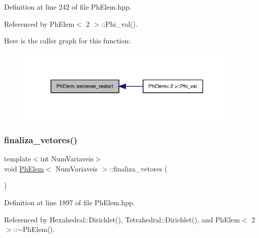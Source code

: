 Definition at line 242 of file Ph\+Elem.\+hpp.



Referenced by Ph\+Elem$<$ 2 $>$\+::\+Phi\+\_\+val().

Here is the caller graph for this function\+:
\nopagebreak
\begin{figure}[H]
\begin{center}
\leavevmode
\includegraphics[width=306pt]{classPhElem_a11a736e86c5b40e5b0a4c84754f2b066_icgraph}
\end{center}
\end{figure}
\mbox{\label{classPhElem_aa7e0f33c0d15b74e1dae945e35626cc7}} 
\subsubsection{\texorpdfstring{finaliza\+\_\+vetores()}{finaliza\_vetores()}}
{\footnotesize\ttfamily template$<$int Num\+Variaveis$>$ \\
void \hyperlink{classPhElem}{Ph\+Elem}$<$ Num\+Variaveis $>$\+::finaliza\+\_\+vetores (\begin{DoxyParamCaption}{ }\end{DoxyParamCaption})}



Definition at line 1897 of file Ph\+Elem.\+hpp.



Referenced by Hexahedral\+::\+Dirichlet(), Tetrahedral\+::\+Dirichlet(), and Ph\+Elem$<$ 2 $>$\+::$\sim$\+Ph\+Elem().

